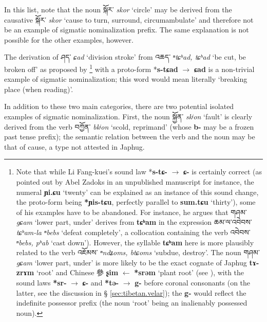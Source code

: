 \documentclass[oneside,a4paper,11pt]{article}
\newcommand{\ipa}[1]{\textbf{{\phon\mbox{#1}}}} %
\newcommand{\zh}[1]{{\cn #1}}
\newcommand{\tibet}[3]{{\tibetain#1} \textit{\phon#2} `#3'}
\begin{document}
In this list, note that the noun \tibet{སྐོར་}{skor}{circle} may be derived from the causative \tibet{སྐོར་}{skor}{cause to turn, surround, circumambulate} and therefore not be an example of sigmatic nominalization prefix. The same explanation is not possible for the other examples, however. 

The derivation of \tibet{ཤད་}{ɕad}{division stroke} from \tibet{འཆད་}{ⁿtɕʰad, tɕʰad}{be cut, be broken off} as proposed by \citet[141]{lifk33}\footnote{Note that while Li Fang-kuei's sound law *\ipa{s-tɕ-} $\rightarrow$ \ipa{ɕ-} is certainly correct (as pointed out by Abel Zadoks in an unpublished manuscript for instance, the numeral \ipa{ɲi.ɕu} `twenty' can be explained as an instance of this sound change, the proto-form being \ipa{*ɲis-tɕu}, perfectly parallel to \ipa{sum.tɕu} `thirty'), some of his examples have to be abandoned. For instance, he argues that \tibet{གཤམ་}{gɕam}{lower part, under} derives from  \ipa{tɕʰam} in the expression \tibet{ཆམ་ལ་འབེབས་}{tɕʰam-la ⁿbebs}{defeat completely}, a collocation containing the verb \tibet{འབེབས་}{ⁿbebs, pʰab}{cast down}). However, the syllable \ipa{tɕʰam} here is more plausibly related to the verb \tibet{འཇོམས་}{ⁿndʑoms, btɕoms}{subdue, destroy}. The noun \tibet{གཤམ་}{gɕam}{lower part, under} is more likely to be the exact cognate of Japhug \ipa{tɤ-zrɤm} `root' and Chinese \zh{參} \ipa{ʂim} $\leftarrow$ \ipa{*srəm} `plant root' (see \citealt{jacques15sr}), with the sound laws \ipa{*sr-} $\rightarrow$ \ipa{ɕ-} and \ipa{*tə-} $\rightarrow$ \ipa{g-} before coronal consonants (on the latter, see the discussion in § \ref{sec:tibetan.velar}); the \ipa{g-} would reflect the indefinite possessor prefix (the noun `root' being an inalienably possessed noun). } with a proto-form *\ipa{s-tɕad} $\rightarrow$ \ipa{ɕad} is a non-trivial example of sigmatic nominalization; this word would mean literally `breaking place (when reading)'.  

In addition to these two main categories, there are two potential isolated examples of sigmatic nominalization. First, the noun \tibet{སྐྱོན་}{skʲon}{fault} is clearly derived from the verb \tibet{བཀྱོན་}{bkʲon}{scold, reprimand} (whose \ipa{b-} may be a frozen past tense prefix); the semantic relation between the verb and the noun may be that of cause, a type not attested in Japhug. 
\end{document}
